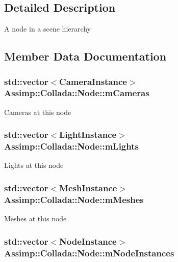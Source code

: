 \subsection{Detailed Description}
A node in a scene hierarchy 

\subsection{Member Data Documentation}
\hypertarget{struct_assimp_1_1_collada_1_1_node_a7adfb203ed36651da1dc4091bb629ca8}{
\subsubsection[{m\+Cameras}]{\setlength{\rightskip}{0pt plus 5cm}std\+::vector$<${\bf Camera\+Instance}$>$ Assimp\+::\+Collada\+::\+Node\+::m\+Cameras}}\label{struct_assimp_1_1_collada_1_1_node_a7adfb203ed36651da1dc4091bb629ca8}
Cameras at this node \hypertarget{struct_assimp_1_1_collada_1_1_node_ac03e565d7c286eb8125b68133255ce95}{
\subsubsection[{m\+Lights}]{\setlength{\rightskip}{0pt plus 5cm}std\+::vector$<${\bf Light\+Instance}$>$ Assimp\+::\+Collada\+::\+Node\+::m\+Lights}}\label{struct_assimp_1_1_collada_1_1_node_ac03e565d7c286eb8125b68133255ce95}
Lights at this node \hypertarget{struct_assimp_1_1_collada_1_1_node_a8f47adb01cfbf847f0dcb5383ca51de9}{
\subsubsection[{m\+Meshes}]{\setlength{\rightskip}{0pt plus 5cm}std\+::vector$<${\bf Mesh\+Instance}$>$ Assimp\+::\+Collada\+::\+Node\+::m\+Meshes}}\label{struct_assimp_1_1_collada_1_1_node_a8f47adb01cfbf847f0dcb5383ca51de9}
Meshes at this node \hypertarget{struct_assimp_1_1_collada_1_1_node_a0e19edb5bc25a3154ed0200fc19850b3}{
\subsubsection[{m\+Node\+Instances}]{\setlength{\rightskip}{0pt plus 5cm}std\+::vector$<${\bf Node\+Instance}$>$ Assimp\+::\+Collada\+::\+Node\+::m\+Node\+Instances}}\label{struct_assimp_1_1_collada_1_1_node_a0e19edb5bc25a3154ed0200fc19850b3}
